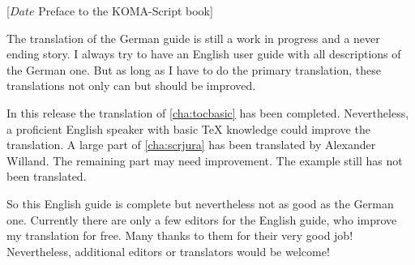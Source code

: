 %
%
%
%
%
%
%
%
%

                 [$Date$
                  Preface to the KOMA-Script book]



The translation of the German \KOMAScript{} guide is still a work in progress
and a never ending story. I always try to have an English user guide with all
descriptions of the German one. But as long as I have to do the primary
translation, these translations not only can but should be improved.

In this release the translation of \autoref{cha:tocbasic} has been
completed. Nevertheless, a proficient English speaker with basic TeX knowledge
could improve the translation. A large part of \autoref{cha:scrjura} has been
translated by Alexander Willand. The remaining part may need improvement. The
example still has not been translated.

So this English guide is complete but nevertheless not as good as the German
one. Currently there are only a few editors for the English guide, who improve
my translation for free. Many thanks to them for their very good job!
Nevertheless, additional editors or translators would be welcome!

\endinput


